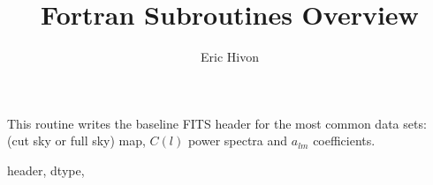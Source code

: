 
\sloppy

\title{\healpix Fortran Subroutines Overview}
 \section[write\_minimal\_header]{ }
\label{sub:write_minimal_header}
\author{Eric Hivon}

\begin{facility}
{This routine writes the baseline FITS header 
for the most common \healpix data sets: (cut sky or full sky) map, $C(l)$ power spectra and $a_{lm}$
coefficients.}
{\modHeadFits}
\end{facility}

\begin{f90format}
{header, dtype,  }
\end{f90format}
\aboutoptional

